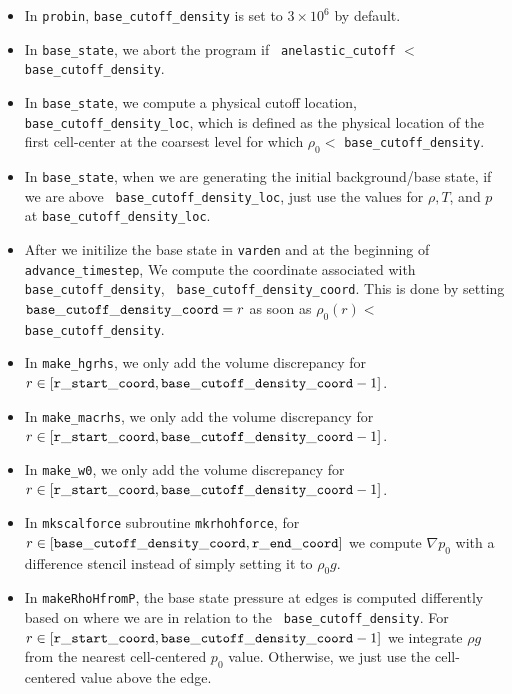 \begin{itemize}

\item In {\tt probin}, {\tt base\_cutoff\_density} is set to $3\times 10^6$
  by default.

\item In {\tt base\_state}, we abort the program if {\tt
  anelastic\_cutoff} $<$ {\tt base\_cutoff\_density}.

\item In {\tt base\_state}, we compute a physical cutoff location,
  {\tt base\_cutoff\_density\_loc}, which is defined as the physical
  location of the first cell-center at the coarsest level for which
  $\rho_0 <$ {\tt base\_cutoff\_density}.

\item In {\tt base\_state}, when we are generating the initial
  background/base state, if we are above {\tt
    base\_cutoff\_density\_loc}, just use the values for $\rho,T$, and
  $p$ at {\tt base\_cutoff\_density\_loc}.

\item After we initilize the base state in {\tt varden} and at the
  beginning of {\tt advance\_timestep}, We compute the coordinate
  associated with {\tt base\_cutoff\_density}, {\tt
    base\_cutoff\_density\_coord}.  This is done by setting ${\tt
    base\_cutoff\_density\_coord}= r$ as soon as $\rho_0(r) <$ {\tt
    base\_cutoff\_density}.

\item In {\tt make\_hgrhs}, we only add the volume discrepancy for
  $r\in[{\tt r\_start\_coord},{\tt base\_cutoff\_density\_coord}-1]$.

\item In {\tt make\_macrhs}, we only add the volume discrepancy for
  $r\in[{\tt r\_start\_coord},{\tt base\_cutoff\_density\_coord}-1]$.

\item In {\tt make\_w0}, we only add the volume discrepancy for
  $r\in[{\tt r\_start\_coord},{\tt base\_cutoff\_density\_coord}-1]$.

\item In {\tt mkscalforce} subroutine {\tt mkrhohforce}, for
  $r\in[{\tt base\_cutoff\_density\_coord},{\tt r\_end\_coord}]$ we
  compute $\nabla p_0$ with a difference stencil instead of simply
  setting it to $\rho_0 g$.

\item In {\tt makeRhoHfromP}, the base state pressure at edges is
  computed differently based on where we are in relation to the {\tt
    base\_cutoff\_density}.  For $r\in[{\tt r\_start\_coord},{\tt
      base\_cutoff\_density\_coord}-1]$ we integrate $\rho g$ from the
  nearest cell-centered $p_0$ value.  Otherwise, we just use the
  cell-centered value above the edge.


\end{itemize}
